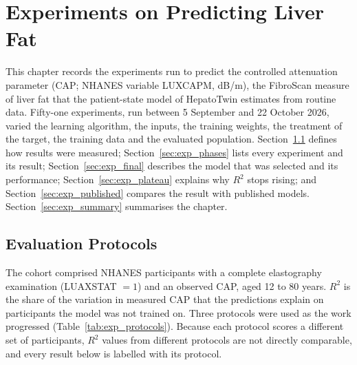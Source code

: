 \chapter{Experiments on Predicting Liver Fat}
\label{chap:experiments}

This chapter records the experiments run to predict the controlled
attenuation parameter (CAP; NHANES variable LUXCAPM, dB/m), the FibroScan
measure of liver fat that the patient-state model of HepatoTwin estimates
from routine data. Fifty-one experiments, run between 5 September and
22 October 2026, varied the learning algorithm, the inputs, the training
weights, the treatment of the target, the training data and the evaluated
population. Section~\ref{sec:exp_protocols} defines how results were
measured; Section~\ref{sec:exp_phases} lists every experiment and its result;
Section~\ref{sec:exp_final} describes the model that was selected and its
performance; Section~\ref{sec:exp_plateau} explains why $R^2$ stops rising;
and Section~\ref{sec:exp_published} compares the result with published
models. Section~\ref{sec:exp_summary} summarises the chapter.

\section{Evaluation Protocols}
\label{sec:exp_protocols}

The cohort comprised NHANES participants with a complete elastography
examination (LUAXSTAT $=1$) and an observed CAP, aged 12 to 80 years. $R^2$
is the share of the variation in measured CAP that the predictions explain
on participants the model was not trained on. Three protocols were used as
the work progressed (Table~\ref{tab:exp_protocols}). Because each protocol
scores a different set of participants, $R^2$ values from different
protocols are not directly comparable, and every result below is labelled
with its protocol.


